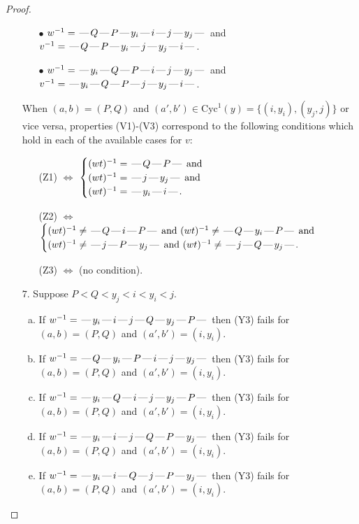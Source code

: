 \documentclass[10pt]{article}
\theoremstyle{definition}
\theoremstyle{definition}
\def\dash{\text{\hspace{0.5mm}---\hspace{0.5mm}}}
\def\Cyc{\mathrm{Cyc}}
\begin{document}
\begin{proof}
\begin{enumerate}
\begin{enumerate}
\item[$\bullet$] $w^{-1} = \dash Q\dash P\dash y_i\dash i\dash j\dash y_j\dash $ and $v^{-1} = \dash Q\dash P\dash y_i\dash j\dash y_j\dash i\dash $.
\item[$\bullet$] $w^{-1} = \dash y_i\dash Q\dash P\dash i\dash j\dash y_j\dash $ and $v^{-1} = \dash y_i\dash Q\dash P\dash j\dash y_j\dash i\dash $.
\end{enumerate}
When $(a,b)= (P,Q)$ and $(a',b')\in \Cyc^1(y)=\{(i,y_i),(y_j,j)\}$ or vice versa,
properties (V1)-(V3) correspond to the following conditions which hold in
each of the available cases for $v$:
\begin{enumerate}
\item[](Z1) $\Leftrightarrow$ $\begin{cases}\text{$(wt)^{-1} = \dash Q \dash P \dash$}\text{ and }\\
\text{$(wt)^{-1} = \dash j \dash y_j \dash$}\text{ and }\\
\text{$(wt)^{-1} = \dash y_i \dash i \dash$}.\end{cases}$
\item[](Z2) $\Leftrightarrow$ $\begin{cases}\text{$(wt)^{-1} \neq \dash Q \dash i \dash P \dash$ and $(wt)^{-1}\neq \dash Q \dash y_i \dash P \dash$}\text{ and }\\
\text{$(wt)^{-1} \neq \dash j \dash P \dash y_j \dash$ and $(wt)^{-1}\neq \dash j \dash Q \dash y_j \dash$}.\end{cases}$
\item[](Z3) $\Leftrightarrow$ (no condition).
\end{enumerate}
\item[$7$.] Suppose $P < Q < y_j < i < y_i < j$.
\begin{enumerate}[(a)]
\item If $w^{-1} = \dash y_i\dash i\dash j\dash Q\dash y_j\dash P\dash $ then (Y3) fails for $(a,b)=(P,Q)$ and $(a',b')=(i,y_i)$.
\item If $w^{-1} = \dash Q\dash y_i\dash P\dash i\dash j\dash y_j\dash $ then (Y3) fails for $(a,b)=(P,Q)$ and $(a',b')=(i,y_i)$.
\item If $w^{-1} = \dash y_i\dash Q\dash i\dash j\dash y_j\dash P\dash $ then (Y3) fails for $(a,b)=(P,Q)$ and $(a',b')=(i,y_i)$.
\item If $w^{-1} = \dash y_i\dash i\dash j\dash Q\dash P\dash y_j\dash $ then (Y3) fails for $(a,b)=(P,Q)$ and $(a',b')=(i,y_i)$.
\item If $w^{-1} = \dash y_i\dash i\dash Q\dash j\dash P\dash y_j\dash $ then (Y3) fails for $(a,b)=(P,Q)$ and $(a',b')=(i,y_i)$.

\end{enumerate}
\end{enumerate}
\end{proof}
\end{document}
